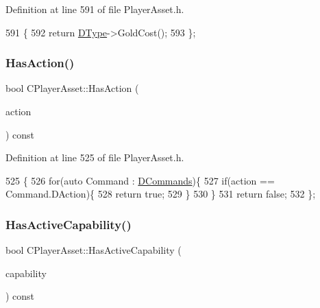 Definition at line 591 of file Player\+Asset.\+h.


\begin{DoxyCode}
591                             \{
592             \textcolor{keywordflow}{return} \hyperlink{classCPlayerAsset_a5d61f73471e1e6f0a6ab15f2ffa7b359}{DType}->GoldCost(); 
593         \};
\end{DoxyCode}
\hypertarget{classCPlayerAsset_acd64c8a11af0f9d17b232d3e1e85dda1}{}\label{classCPlayerAsset_acd64c8a11af0f9d17b232d3e1e85dda1} 
\subsubsection{\texorpdfstring{Has\+Action()}{HasAction()}}
{\footnotesize\ttfamily bool C\+Player\+Asset\+::\+Has\+Action (\begin{DoxyParamCaption}\item[{\hyperlink{GameDataTypes_8h_ab47668e651a3032cfb9c40ea2d60d670}{E\+Asset\+Action}}]{action }\end{DoxyParamCaption}) const\hspace{0.3cm}{\ttfamily [inline]}}



Definition at line 525 of file Player\+Asset.\+h.


\begin{DoxyCode}
525                                                  \{
526             \textcolor{keywordflow}{for}(\textcolor{keyword}{auto} Command : \hyperlink{classCPlayerAsset_a4d3b96106d3b1c1020f98005884d2a87}{DCommands})\{
527                 \textcolor{keywordflow}{if}(action == Command.DAction)\{
528                     \textcolor{keywordflow}{return} \textcolor{keyword}{true};   
529                 \}
530             \}
531             \textcolor{keywordflow}{return} \textcolor{keyword}{false};
532         \};
\end{DoxyCode}
\hypertarget{classCPlayerAsset_a6502fe94b663fb3729086ffad530d5ca}{}\label{classCPlayerAsset_a6502fe94b663fb3729086ffad530d5ca} 
\subsubsection{\texorpdfstring{Has\+Active\+Capability()}{HasActiveCapability()}}
{\footnotesize\ttfamily bool C\+Player\+Asset\+::\+Has\+Active\+Capability (\begin{DoxyParamCaption}\item[{\hyperlink{GameDataTypes_8h_a35b98ce26aca678b03c6f9f76e4778ce}{E\+Asset\+Capability\+Type}}]{capability }\end{DoxyParamCaption}) const\hspace{0.3cm}{\ttfamily [inline]}}



